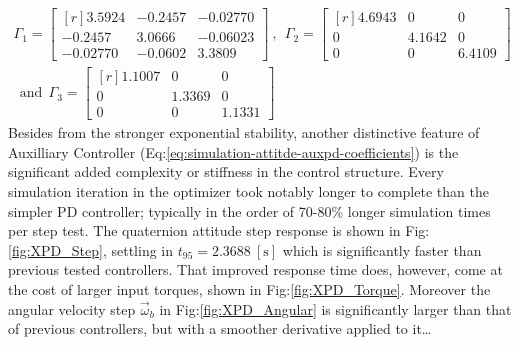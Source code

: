 \begin{multline}\label{eq:optimized-auxpd}
\Gamma_1=\begin{bmatrix*}[r]
3.5924 & -0.2457 & -0.02770\\
-0.2457 & 3.0666 & -0.06023\\
-0.02770 & -0.0602 & 3.3809
\end{bmatrix*}~,~~\Gamma_2=\begin{bmatrix*}[r]
4.6943 & 0 & 0\\
0 & 4.1642 & 0\\
0 & 0 & 6.4109
\end{bmatrix*}\\
~~\text{and}~~\Gamma_3=\begin{bmatrix*}[r]
1.1007 & 0 & 0\\
0 & 1.3369 & 0 \\
0 & 0 & 1.1331
\end{bmatrix*}
\end{multline}
Besides from the stronger exponential stability, another distinctive feature of Auxilliary Controller (Eq:\ref{eq:simulation-attitde-auxpd-coefficients}) is the significant added complexity or stiffness in the control structure. Every simulation iteration in the optimizer took notably longer to complete than the simpler PD controller; typically in the order of 70-80\% longer simulation times per step test. The quaternion attitude step response is shown in Fig:\ref{fig:XPD_Step}, settling in $t_{95}=2.3688~[\text{s}]$ which is significantly faster than previous tested controllers. That improved response time does, however, come at the cost of larger input torques, shown in Fig:\ref{fig:XPD_Torque}. Moreover the angular velocity step $\vec{\omega}_b$ in Fig:\ref{fig:XPD_Angular} is significantly larger than that of previous controllers, but with a smoother derivative applied to it\ldots
\par
